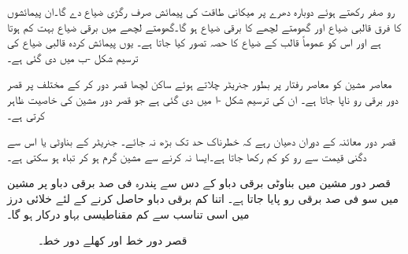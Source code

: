 رو   صفر رکھتے ہوئے دوبارہ دھرے پر میکانی طاقت  کی پیمائش صرف رگڑی ضیاع دے گا۔ان پیمائشوں کا فرق   قالبی ضیاع  اور گھومتے لچھے کا برقی ضیاع  ہو گا۔گھومتے لچھے میں برقی ضیاع بہت کم ہوتا ہے اور اس کو عموماً قالب کے ضیاع کا حصہ تصور کیا جاتا ہے۔ یوں  پیمائش کردہ قالبی ضیاع کی ترسیم شکل  -ب میں دی گئی ہے۔

معاصر مشین کو معاصر رفتار پر بطور جنریٹر  چلاتے ہوئے  ساکن لچھا قصر دور کر کے مختلف  پر قصر دور برقی رو  ناپا جاتا ہے۔ ان کی ترسیم شکل -ا میں دی گئی ہے جو قصر دور مشین کی خاصیت ظاہر کرتی ہے۔ 

 قصر دور معائنہ کے دوران  دھیان رہے  کہ   خطرناک حد تک  بڑھ نہ جائے۔  جنریٹر کے بناوٹی   یا اس سے دگنی قیمت  سے رو کو  کم رکھا جاتا ہے۔ایسا نہ کرنے سے مشین گرم ہو کر تباہ ہو سکتی ہے۔

قصر دور مشین میں بناوٹی برقی دباو کے دس سے پندرہ فی صد برقی دباو پر مشین میں سو فی صد برقی رو پایا جاتا ہے۔ اتنا کم برقی دباو حاصل کرنے کے لئے خلائی درز میں اسی تناسب سے  کم مقناطیسی بہاو درکار ہو گا۔ 
\begin{figure}
\centering
\begin{subfigure}{0.45\textwidth}
\centering
{}%
\caption{}
\end{subfigure}\hfill
\begin{subfigure}{0.45\textwidth}
\centering
{}
\caption{}
\end{subfigure}%
\caption{قصر دور خط اور کھلے دور خط۔}
\label{شکل_معاصر_کسر_دور_اور_کھلے_دور_خط}
\end{figure}

